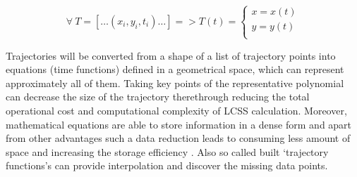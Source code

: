\begin{equation}\label{eq:regr-func}
	\forall\ T = [\ldots (x_i, y_i, t_i) \ldots] = > T(t) = 
		\begin{cases}
			x = x(t) \\
			y = y(t) \\
		\end{cases}
\end{equation}

Trajectories will be converted from a shape of a list of trajectory points into equations (time functions) defined in a geometrical space, which can represent approximately all of them. Taking key points of the representative polynomial can decrease the size of the trajectory therethrough reducing the total operational cost and computational complexity of LCSS calculation. Moreover, mathematical equations are able to store information in a dense form and apart from other advantages such a data reduction leads to consuming less amount of space and increasing the storage efficiency \cite{article:behav_form_extr}. Also so called built `trajectory functions's can provide interpolation and discover the missing data points.

